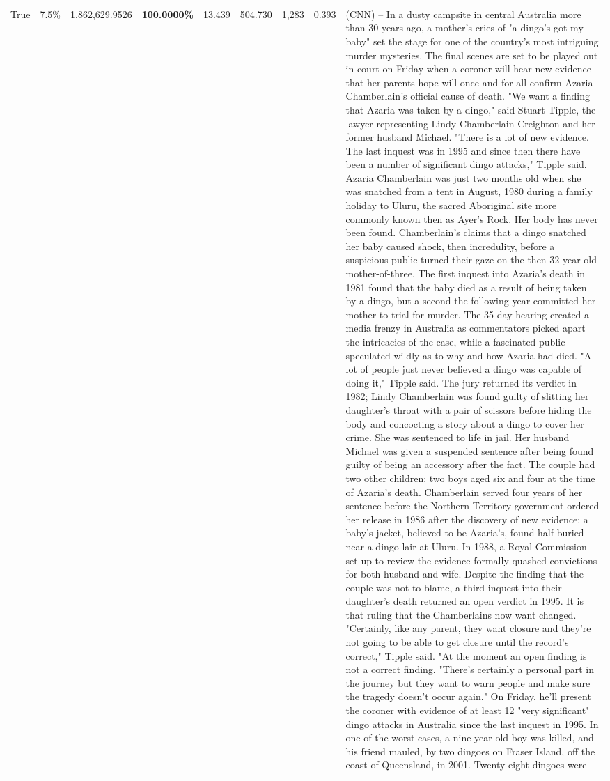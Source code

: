 \begin{table}[H]
\begin{tabular}{lllrlllll}
True & 7.5\% & 1,862,629.9526 & \bfseries \color{red} 100.0000\% & 13.439 & 504.730 & 1,283 & 0.393 & (CNN) -- In a dusty campsite in central Australia more than 30 years ago, a mother's cries of "a dingo's got my baby" set the stage for one of the country's most intriguing murder mysteries. The final scenes are set to be played out in court on Friday when a coroner will hear new evidence that her parents hope will once and for all confirm Azaria Chamberlain's official cause of death. "We want a finding that Azaria was taken by a dingo," said Stuart Tipple, the lawyer representing Lindy Chamberlain-Creighton and her former husband Michael. "There is a lot of new evidence. The last inquest was in 1995 and since then there have been a number of significant dingo attacks," Tipple said. Azaria Chamberlain was just two months old when she was snatched from a tent in August, 1980 during a family holiday to Uluru, the sacred Aboriginal site more commonly known then as Ayer's Rock. Her body has never been found. Chamberlain's claims that a dingo snatched her baby caused shock, then incredulity, before a suspicious public turned their gaze on the then 32-year-old mother-of-three. The first inquest into Azaria's death in 1981 found that the baby died as a result of being taken by a dingo, but a second the following year committed her mother to trial for murder. The 35-day hearing created a media frenzy in Australia as commentators picked apart the intricacies of the case, while a fascinated public speculated wildly as to why and how Azaria had died. "A lot of people just never believed a dingo was capable of doing it," Tipple said. The jury returned its verdict in 1982; Lindy Chamberlain was found guilty of slitting her daughter's throat with a pair of scissors before hiding the body and concocting a story about a dingo to cover her crime. She was sentenced to life in jail. Her husband Michael was given a suspended sentence after being found guilty of being an accessory after the fact. The couple had two other children; two boys aged six and four at the time of Azaria's death. Chamberlain served four years of her sentence before the Northern Territory government ordered her release in 1986 after the discovery of new evidence; a baby's jacket, believed to be Azaria's, found half-buried near a dingo lair at Uluru. In 1988, a Royal Commission set up to review the evidence formally quashed convictions for both husband and wife. Despite the finding that the couple was not to blame, a third inquest into their daughter's death returned an open verdict in 1995. It is that ruling that the Chamberlains now want changed. "Certainly, like any parent, they want closure and they're not going to be able to get closure until the record's correct," Tipple said. "At the moment an open finding is not a correct finding. "There's certainly a personal part in the journey but they want to warn people and make sure the tragedy doesn't occur again." On Friday, he'll present the coroner with evidence of at least 12 "very significant" dingo attacks in Australia since the last inquest in 1995. In one of the worst cases, a nine-year-old boy was killed, and his friend mauled, by two dingoes on Fraser Island, off the coast of Queensland, in 2001. Twenty-eight dingoes were 
\end{tabular}
\end{table}
